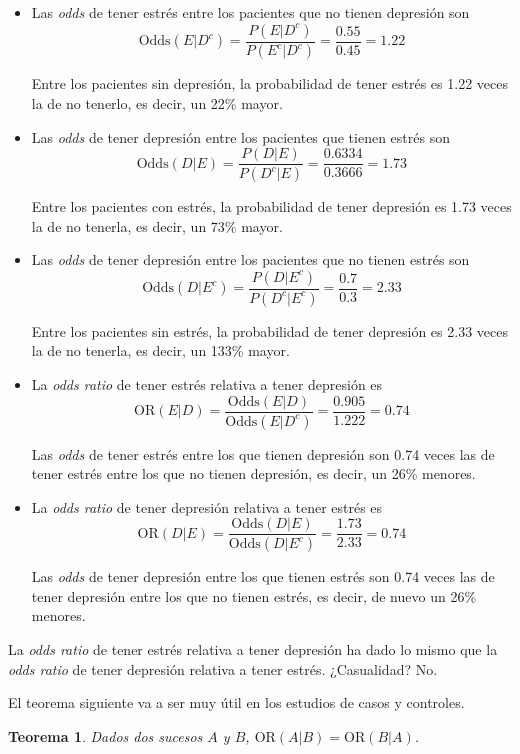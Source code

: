 \documentclass[
]{book}
\newtheorem{theorem}{Teorema}[chapter]
\theoremstyle{definition}
\theoremstyle{definition}
\theoremstyle{definition}
\theoremstyle{definition}
\theoremstyle{remark}
\begin{document}
\begin{itemize}
\item
  Las \emph{odds} de tener estrés entre los pacientes que no tienen depresión son
  \[
  \text{Odds}(E|D^c)=\frac{P(E|D^c)}{P(E^c|D^c)}=\frac{0.55}{0.45}=1.22
  \]

  Entre los pacientes sin depresión, la probabilidad de tener estrés es 1.22 veces la de no tenerlo, es decir, un 22\% mayor.
\item
  Las \emph{odds} de tener depresión entre los pacientes que tienen estrés son
  \[
  \text{Odds}(D|E)=\frac{P(D|E)}{P(D^c|E)}=\frac{0.6334}{0.3666}=1.73
  \]

  Entre los pacientes con estrés, la probabilidad de tener depresión es 1.73 veces la de no tenerla, es decir, un 73\% mayor.
\item
  Las \emph{odds} de tener depresión entre los pacientes que no tienen estrés son
  \[
  \text{Odds}(D|E^c)=\frac{P(D|E^c)}{P(D^c|E^c)}=\frac{0.7}{0.3}=2.33
  \]

  Entre los pacientes sin estrés, la probabilidad de tener depresión es 2.33 veces la de no tenerla, es decir, un 133\% mayor.
\item
  La \emph{odds ratio} de tener estrés relativa a tener depresión es
  \[
  \text{OR}(E|D)=\frac{\text{Odds}(E|D)}{\text{Odds}(E|D^c)}=\frac{0.905}{1.222}=0.74
  \]

  Las \emph{odds} de tener estrés entre los que tienen depresión son 0.74 veces las de tener estrés entre los que no tienen depresión, es decir, un 26\% menores.
\item
  La \emph{odds ratio} de tener depresión relativa a tener estrés es
  \[
  \text{OR}(D|E)=\frac{\text{Odds}(D|E)}{\text{Odds}(D|E^c)}=\frac{1.73}{2.33}=0.74
  \]

  Las \emph{odds} de tener depresión entre los que tienen estrés son 0.74 veces las de tener depresión entre los que no tienen estrés, es decir, de nuevo un 26\% menores.
\end{itemize}

\begin{rmdromans}
La \emph{odds ratio} de tener estrés relativa a tener depresión ha dado lo mismo que la \emph{odds ratio} de tener depresión relativa a tener estrés. ¿Casualidad? No.
\end{rmdromans}

El teorema siguiente va a ser muy útil en los estudios de casos y controles.

\begin{theorem}
\protect\hypertarget{thm:ORrelativa}{}\label{thm:ORrelativa}Dados dos sucesos \(A\) y \(B\), \(\text{OR}(A|B)=\text{OR}(B|A)\).
\end{theorem}
\end{document}

